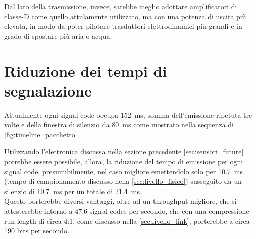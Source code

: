 Dal lato della trasmissione, invece, sarebbe meglio adottare amplificatori di classe-D come quello attulamente utilizzato, 
ma con una potenza di uscita più elevata, in modo da poter pilotare trasduttori elettrodinamici più grandi e in grado di spostare più aria o acqua.\\


\section{Riduzione dei tempi di segnalazione}
\label{sec:velocita}

Attualmente ogni signal code occupa \SI{152}{\milli\second}, somma dell'emissione ripetuta tre volte e della finestra di silenzio da \SI{80}{\milli\second} 
 come mostrato nella sequenza di \autoref{fig:timeline_pacchetto}. 

Utilizzando l'elettronica discussa nella sezione precedente \autoref{sec:sensori_future} potrebbe essere possibile, allora, la riduzione
del tempo di emissione per ogni signal code, presumibilmente, nel caso migliore emettendolo solo per \SI{10.7}{\milli\second} 
(tempo di campionamento discusso nella \autoref{sec:livello_fisico})
susseguito da un silenzio di \SI{10.7}{\milli\second} per un totale di  \SI{21.4}{\milli\second}. \\
 

Questo porterebbe diversi vantaggi, oltre ad un throughput migliore, che si attesterebbe intorno a 47.6 signal codes per secondo, che con una compressione 
run-length di circa 4:1, come discusso nella \autoref{sec:livello_link}, porterebbe a circa 190 bits per secondo.

